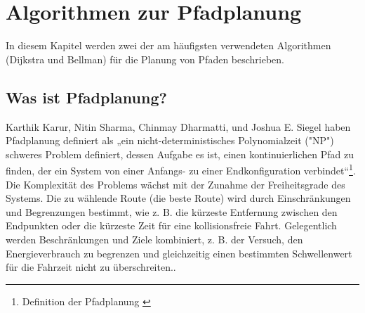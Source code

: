 \chapter{Algorithmen zur Pfadplanung}
In diesem Kapitel werden zwei der am häufigsten verwendeten Algorithmen (Dijkstra und Bellman) für die Planung von Pfaden beschrieben.

\section{Was ist Pfadplanung?}
\label{Was ist Pfadplanung?}
Karthik Karur, Nitin Sharma, Chinmay Dharmatti, und Joshua E. Siegel haben Pfadplanung definiert als „ein nicht-deterministisches Polynomialzeit ("NP") schweres Problem definiert, dessen Aufgabe es ist, einen kontinuierlichen Pfad zu finden, der ein System von einer Anfangs- zu einer Endkonfiguration verbindet“\footnote{Definition der Pfadplanung \cite{Karur2021}}.
\newline
\newline
Die Komplexität des Problems wächst mit der Zunahme der Freiheitsgrade des Systems. Die zu wählende Route (die beste Route) wird durch Einschränkungen und Begrenzungen bestimmt, wie z. B. die kürzeste Entfernung zwischen den Endpunkten oder die kürzeste Zeit für eine kollisionsfreie Fahrt. Gelegentlich werden Beschränkungen und Ziele kombiniert, z. B. der Versuch, den Energieverbrauch zu begrenzen und gleichzeitig einen bestimmten Schwellenwert für die Fahrzeit nicht zu überschreiten.\cite{Karur2021}.

